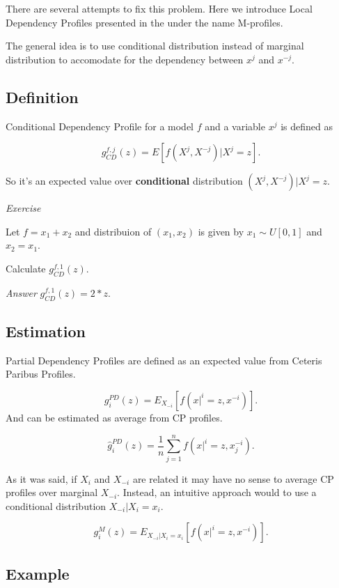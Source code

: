 \documentclass[12pt,]{krantz}
\begin{document}
There are several attempts to fix this problem. Here we introduce Local Dependency Profiles presented in the \citep{R-ALEPlot} under the name M-profiles.

The general idea is to use conditional distribution instead of marginal distribution to accomodate for the dependency between \(x^j\) and \(x^{-j}\).

\hypertarget{definition-1}{%
\subsection{Definition}\label{definition-1}}

Conditional Dependency Profile for a model \(f\) and a variable \(x^j\) is defined as

\[
g_{CD}^{f, j}(z) = E[f(X^j, X^{-j})|X^j = z].
\]

So it's an expected value over \textbf{conditional} distribution \((X^j,X^{-j})|X^j=z\).

\emph{Exercise}

Let \(f = x_1 + x_2\) and distribuion of \((x_1, x_2)\) is given by \(x_1 \sim U[0,1]\) and \(x_2=x_1\).

Calculate \(g_{CD}^{f, 1}(z)\).

\emph{Answer} \(g_{CD}^{f, 1}(z) = 2*z\).

\hypertarget{estimation-1}{%
\subsection{Estimation}\label{estimation-1}}

Partial Dependency Profiles are defined as an expected value from Ceteris Paribus Profiles.

\[
g^{PD}_i(z) = E_{X_{-i}}[ f(x|^i = z, x^{-i}) ].
\]
And can be estimated as average from CP profiles.

\[
\hat g^{PD}_i(z) = \frac{1}{n} \sum_{j=1}^{n} f(x|^i = z, x_j^{-i}).
\]

As it was said, if \(X_i\) and \(X_{-i}\) are related it may have no sense to average CP profiles over marginal \(X_{-i}\). Instead, an intuitive approach would to use a conditional distribution \(X_{-i}|X_i=x_i\).

\[
g^{M}_i(z) = E_{X_{-i}|X_i=x_i}[ f(x|^i = z, x^{-i}) ].
\]

\hypertarget{example-1}{%
\subsection{Example}\label{example-1}}
\end{document}
